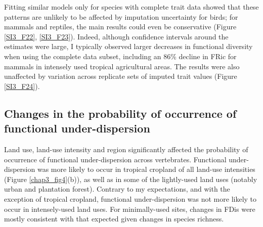 Fitting similar models only for species with complete trait data showed that these patterns are unlikely to be affected by imputation uncertainty for birds; for mammals and reptiles, the main results could even be conservative (Figure \ref{SI3_F22}, \ref{SI3_F23}). Indeed, although confidence intervals around the estimates were large, I typically observed larger decreases in functional diversity when using the complete data subset, including an 86\% decline in FRic for mammals in intensely used tropical agricultural areas. The results were also unaffected by variation across replicate sets of imputed trait values (Figure \ref{SI3_F24}).


\subsection{Changes in the probability of occurrence of functional under-dispersion}

Land use, land-use intensity and region significantly affected the probability of occurrence of functional under-dispersion across vertebrates. Functional under-dispersion was more likely to occur in tropical cropland of all land-use intensities (Figure \ref{chap3_fig4}(b)), as well as in some of the lightly-used land uses (notably urban and plantation forest). Contrary to my expectations, and with the exception of tropical cropland, functional under-dispersion was not more likely to occur in intensely-used land uses. For minimally-used sites, changes in FDis were mostly consistent with that expected given changes in species richness.

